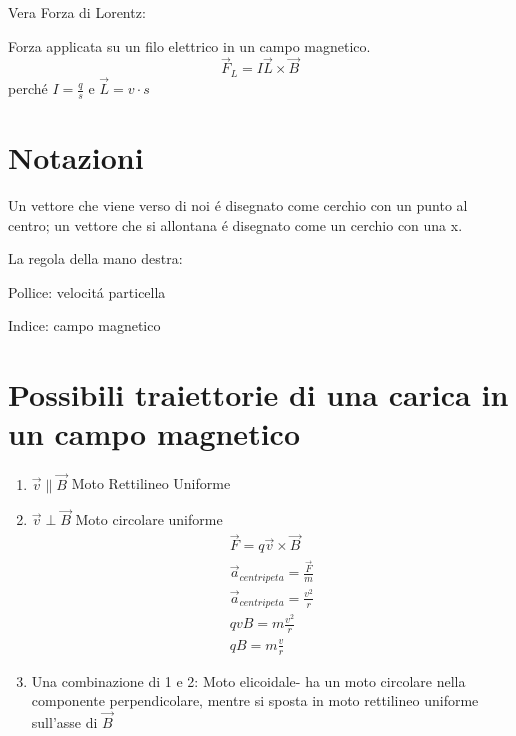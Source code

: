 \documentclass{article}
\begin{document}
Vera Forza di Lorentz:

Forza applicata su un filo elettrico in un campo magnetico.
\[\vec{F}_L=I\vec{L}\times \vec{B}\]
perché $I=\frac{q}{s}$ e $\vec{L}=v\cdot s$
\section*{Notazioni}
Un vettore che viene verso di noi é disegnato come cerchio con un punto al centro; un vettore che si allontana é disegnato come un cerchio con una x.

La regola della mano destra:

Pollice: velocitá particella

Indice: campo magnetico
\section*{Possibili traiettorie di una carica in un campo magnetico}
\begin{enumerate}

\item $\vec{v}\parallel \vec{B}$ Moto Rettilineo Uniforme
\item $\vec{v}\perp \vec{B} $ Moto circolare uniforme
\begin{gather*}
\vec{F} = q\vec{v}\times \vec{B}\\
\vec{a}_{centripeta}=\frac{\vec{F}}{m}\\
\vec{a}_{centripeta}=\frac{v^2}{r}\\
qvB=m\frac{v^2}{r}\\
qB=m\frac{v}{r}
\end{gather*}
\item Una combinazione di 1 e 2: Moto elicoidale- ha un moto circolare nella componente perpendicolare, mentre si sposta in moto rettilineo uniforme sull'asse di $\vec{B}$
\end{enumerate}
\end{document}
